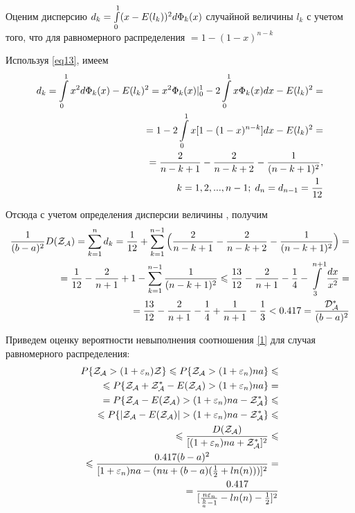 \documentclass[a4paper, 14pt]{extarticle}
\numberwithin{equation}{section}
\begin{document}
Оценим дисперсию $d_k=\int\limits_0^1 (x-E(l_k))^2 d\text{$\Phi_k(x)$}$ случайной величины $l_k$ с учетом того, что для равномерного распределения \chanceLklesserX{} $ = 1-(1-x)^{n-k}$

Используя \eqref{eq13}, имеем
\begin{align*}
d_k = \int\limits_0^1 x^2 d \text{$\Phi_k(x)$}-E(l_k)^2=x^2 \text{$\Phi_k(x)$} 	
|_0^1 - 2 \int\limits_0^1 x \text{$\Phi_k(x)$}dx - E(l_k)^2=\\
= 1-2\int\limits_0^1 x[1-(1-x)^{n-k}]dx-E(l_k)^2 =\\
= \frac{2}{n-k+1} - \frac{2}{n-k+2} - \frac{1}{(n-k+1)^2}, \\ 
\; k=1,2,...,n-1; \; d_n = d_{n-1} = \frac{1}{12}
\end{align*}

Отсюда с учетом определения дисперсии величины \randomvalue{} , получим
\begin{equation*}
\begin{aligned}
\frac{1}{(b-a)^2} \text{$D(\text{$\mathcal{Z_{A}}$})$} = \sum_{k=1}^n d_k = \frac{1}{12} + \sum_{k=1}^{n-1} \Big(\frac{2}{n-k+1} - \frac{2}{n-k+2} - \frac{1}{(n-k+1)^2} \Big) = \\
= \frac{1}{12} - \frac{2}{n+1} +1 - \sum_{k=1}^{n-1} \frac{1}{(n-k+1)^2} \leqslant \frac{13}{12} - \frac{2}{n+1} - \frac{1}{4} - \int\limits_3^{n+1} \frac{dx}{x^2} = \\
= \frac{13}{12} - \frac{2}{n+1} - \frac{1}{4} + \frac{1}{n+1} - \frac{1}{3} < 0.417 = \frac{\text{$\mathcal{D^*_{A}}$}}{(b-a)^2} 
\end{aligned}
\end{equation*}

Приведем оценку вероятности невыполнения соотношения \eqref{1} для случая равномерного распределения:
\begin{equation}\label{14}
\begin{aligned}
P\{ \text{$\mathcal{Z_{A}}$} > (1+\varepsilon_n) \mathcal{Z} \} \leqslant P\{ \text{$\mathcal{Z_{A}}$} > (1+\varepsilon_n)na \} \leqslant \\
\leqslant P\{ \text{$\mathcal{Z_{A}}$} + \text{$\mathcal{Z^*_{A}}$} - \text{$E(\text{$\mathcal{Z_{A}}$})$} > (1+\varepsilon_n)na \} = \\
= P \{ \text{$\mathcal{Z_{A}}$} - \text{$E(\text{$\mathcal{Z_{A}}$})$} > (1+\varepsilon_n)na - \text{$\mathcal{Z^*_{A}}$} \} \leqslant \\
\leqslant P \{ |\text{$\mathcal{Z_{A}}$} - \text{$E(\text{$\mathcal{Z_{A}}$})$}| > (1+\varepsilon_n)na - \text{$\mathcal{Z^*_{A}}$} \} \leqslant \\
\leqslant \frac{\text{$D(\text{$\mathcal{Z_{A}}$})$}}{[(1+\varepsilon_n)na + \text{$\mathcal{Z^*_{A}}$}]^2} \leqslant \\
\leqslant \frac{0.417(b-a)^2}{[1+\varepsilon_n)na-(nu+(b-a)(\frac{1}{2}+ln(n)))]^2} = \\
= \frac{0.417}{[\frac{n\varepsilon_n}{\frac{b}{a}-1}-ln(n) -\frac{1}{2}]^2}
\end{aligned}
\end{equation}
\end{document}
